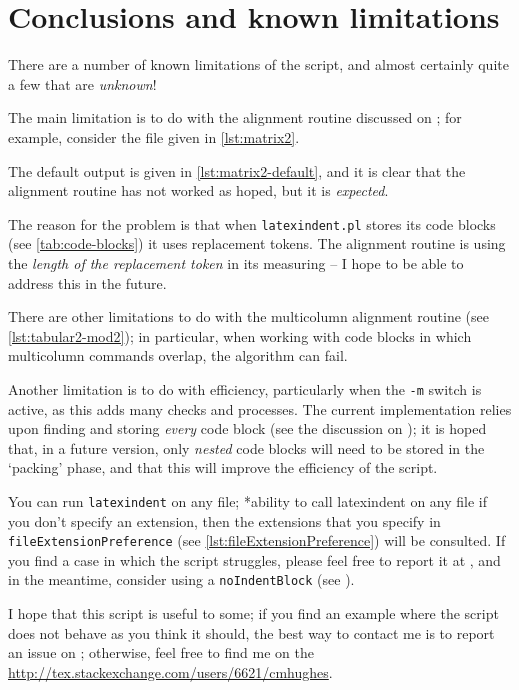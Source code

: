 \section{Conclusions and known limitations}\label{sec:knownlimitations}
 There are a number of known limitations of the script, and almost certainly quite a few
 that are \emph{unknown}!

 The main limitation is to do with the alignment routine discussed on
 ; for example, consider the file given in \cref{lst:matrix2}.


 The default output is given in \cref{lst:matrix2-default}, and it is clear that the alignment
 routine has not worked as hoped, but it is \emph{expected}. 

 The reason for the problem is that when \texttt{latexindent.pl} stores its code blocks
 (see \vref{tab:code-blocks}) it uses replacement tokens. The alignment routine is using
 the \emph{length of the replacement token} in its measuring -- I hope to be able to address this in the
 future.

 There are other limitations to do with the multicolumn alignment routine (see
 \vref{lst:tabular2-mod2}); in particular, when working with code blocks in which multicolumn
 commands overlap, the algorithm can fail.

 Another limitation is to do with efficiency, particularly when the \texttt{-m}
 switch is active, as this adds many checks and processes. The current implementation
 relies upon finding and storing \emph{every} code block (see the discussion on
 ); it is hoped that, in a future version, only
 \emph{nested} code blocks will need to be stored in the `packing' phase, and
 that this will improve the efficiency of the script.

 You can run \texttt{latexindent} on any file;%
 *{ability to call latexindent on any file} if you don't specify an extension, then the extensions that you
 specify in \lstinline[breaklines=true]!fileExtensionPreference! (see \vref{lst:fileExtensionPreference}) will be consulted. If you
 find a case in which the script struggles, please feel free to report it at
 \cite{latexindent-home}, and in the meantime, consider using a \texttt{noIndentBlock} (see ).

 I hope that this script is useful to some; if you find an example where the script does
 not behave as you think it should, the best way to contact me is to report an issue on
 \cite{latexindent-home}; otherwise, feel free to find me on the \url{http://tex.stackexchange.com/users/6621/cmhughes}.
